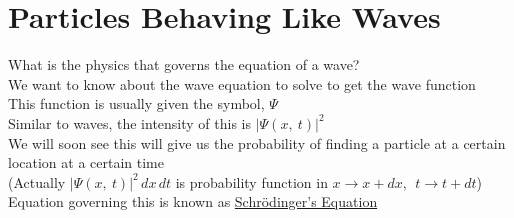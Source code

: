 \documentclass[a4paper, 11pt, fleqn, normalem]{report}
\begin{document}
\section{Particles Behaving Like Waves}
What is the physics that governs the equation of a wave? \\
We want to know about the wave equation to solve to get the wave function \\
This function is usually given the symbol, $\Psi$ \\
Similar to waves, the intensity of this is $|\Psi(x,\:t)|^{2}$ \\
We will soon see this will give us the probability of finding a particle at a certain location at a certain time \\
(Actually $|\Psi(x,\:t)|^{2}\,dx\,dt$ is probability function in $x \rightarrow x + dx,~~t \rightarrow t + dt$) \\
Equation governing this is known as \underline{Schr\"{o}dinger's Equation}
\end{document}
